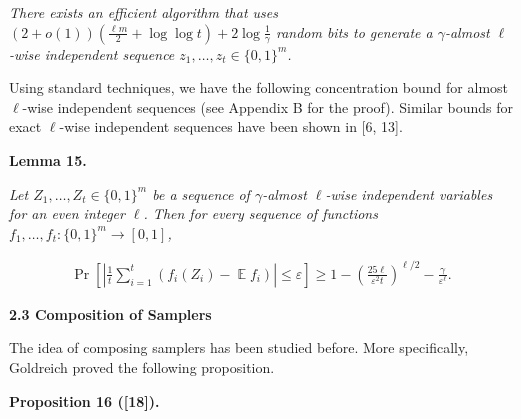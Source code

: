 \documentclass[10pt,a4paper]{article}
\begin{document}
\emph{There exists an efficient algorithm that uses
$(2+o(1))(\frac{\ell m}{2}+\log\log t)+2\log\frac{1}{\gamma}$
random bits to generate a $\gamma$-almost $\ell$-wise independent sequence $z_{1},\dots,z_{t}\in\{0,1\}^{m}$.}\par






Using standard techniques, we have the following concentration bound for almost $\ell$-wise independent sequences (see Appendix B for the proof). Similar bounds for exact $\ell$-wise independent sequences have been shown in [6, 13].\par





\par\medskip\noindent\textbf{
\textbf{Lemma 15}\textbf{.}
}\par



\emph{Let $Z_{1},\dots,Z_{t}\in\{0,1\}^{m}$ be a sequence of $\gamma$-almost $\ell$-wise independent variables for an even integer $\ell$. Then for every sequence of functions $f_{1},\dots,f_{t}:\{0,1\}^{m}\to[0,1]$,}\par


\[\begin{gathered}
\Pr\left[\left|\frac{1}{t}\sum_{i=1}^{t}(f_{i}(Z_{i})-\operatorname*{\mathbb{E}}f_{i})\right|\leq\varepsilon\right]\geq 1-\left(\frac{25{\ell}}{\varepsilon^{2}{t}}\right)^{\ell/2}-\frac{\gamma}{\varepsilon^{\ell}}.
\end{gathered}\]







\par\medskip\noindent\textbf{
2.3 Composition of Samplers}\par




The idea of composing samplers has been studied before. More specifically, Goldreich proved the following proposition.\par





\par\medskip\noindent\textbf{
\textbf{Proposition 16}\textbf{ }([18])\textbf{.}
}\par
\end{document}
